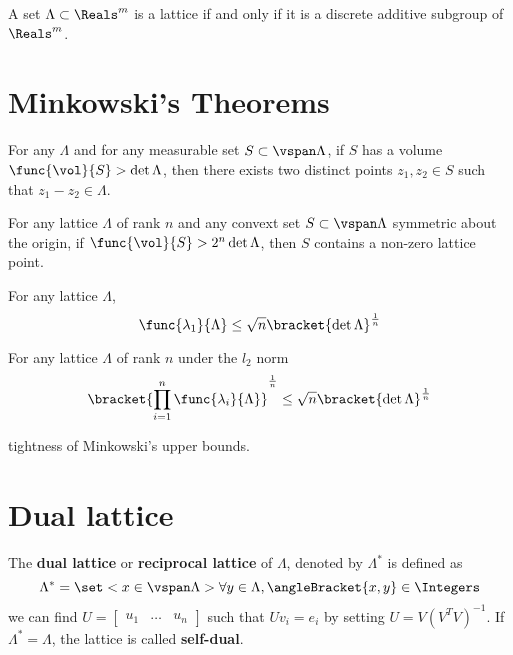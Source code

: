 \begin{theorem}
    A set \(\Lambda \subset \Reals^m\) is a lattice if and only if it is a discrete additive subgroup of \(\Reals^m\).
\end{theorem}
\section{Minkowski's Theorems}
\begin{theorem}
    For any \(\Lambda\) and for any measurable set \(S \subset \vspan \Lambda\), if \(S\) has a volume \(\func{\vol}{S} > \det \Lambda\), then there exists two distinct points \(z_1,z_2 \in S\) such that \(z_1 - z_2 \in \Lambda\).    
\end{theorem}

\begin{theorem}
    For any lattice \(\Lambda\) of rank \(n\) and any convext set \(S \subset \vspan \Lambda\) symmetric about the origin, if \(\func{\vol}{S} > 2^n \det\Lambda\), then \(S\) contains a non-zero lattice point.    
\end{theorem}

\begin{theorem}
    For any lattice \(\Lambda\),
    \begin{equation*}
        \func{\lambda_1}{\Lambda} \leq \sqrt{n} \bracket{\det \Lambda}^{\frac{1}{n}}
    \end{equation*}
\end{theorem}

\begin{theorem}
    For any lattice \(\Lambda\) of rank \(n\) under the \(l_2\) norm
    \begin{equation*}
        \bracket{\prod_{i=1}^n\func{\lambda_i}{\Lambda}}^{\frac{1}{n}} \leq \sqrt{n} \bracket{\det \Lambda}^{\frac{1}{n}}
    \end{equation*}
\end{theorem}
tightness of Minkowski's upper bounds.


\section{Dual lattice}
\begin{definition}
    The \textbf{dual lattice} or \textbf{reciprocal lattice} of \(\Lambda\), denoted by \(\Lambda^{\ast}\) is defined as 
    \begin{equation*}
        \Lambda^{\ast} = \set<x \in \vspan \Lambda>{\forall y \in \Lambda, \angleBracket{x,y} \in \Integers}
    \end{equation*}
    we can find \(U = \begin{bmatrix}
        u_1 & \dots & u_n
    \end{bmatrix}\)
    such that \(Uv_i = e_i\) by setting \(U = V(V^TV)^{-1}\). If \(\Lambda^{\ast} = \Lambda\), the lattice is called \textbf{self-dual}.
\end{definition}


